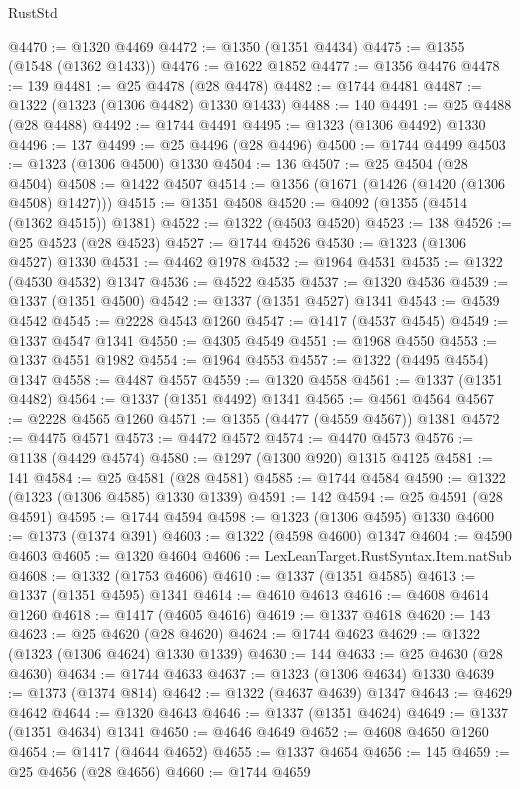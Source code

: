 \begin{lexlean}{RustStd}
\begin{coremodule}
@4470 := @1320 @4469
@4472 := @1350 (@1351 @4434)
@4475 := @1355 (@1548 (@1362 @1433))
@4476 := @1622 @1852
@4477 := @1356 @4476
@4478 := 139
@4481 := @25 @4478 (@28 @4478)
@4482 := @1744 @4481
@4487 := @1322 (@1323 (@1306 @4482) @1330 @1433)
@4488 := 140
@4491 := @25 @4488 (@28 @4488)
@4492 := @1744 @4491
@4495 := @1323 (@1306 @4492) @1330
@4496 := 137
@4499 := @25 @4496 (@28 @4496)
@4500 := @1744 @4499
@4503 := @1323 (@1306 @4500) @1330
@4504 := 136
@4507 := @25 @4504 (@28 @4504)
@4508 := @1422 @4507
@4514 := @1356 (@1671 (@1426 (@1420 (@1306 @4508) @1427)))
@4515 := @1351 @4508
@4520 := @4092 (@1355 (@4514 (@1362 @4515)) @1381)
@4522 := @1322 (@4503 @4520)
@4523 := 138
@4526 := @25 @4523 (@28 @4523)
@4527 := @1744 @4526
@4530 := @1323 (@1306 @4527) @1330
@4531 := @4462 @1978
@4532 := @1964 @4531
@4535 := @1322 (@4530 @4532) @1347
@4536 := @4522 @4535
@4537 := @1320 @4536
@4539 := @1337 (@1351 @4500)
@4542 := @1337 (@1351 @4527) @1341
@4543 := @4539 @4542
@4545 := @2228 @4543 @1260
@4547 := @1417 (@4537 @4545)
@4549 := @1337 @4547 @1341
@4550 := @4305 @4549
@4551 := @1968 @4550
@4553 := @1337 @4551 @1982
@4554 := @1964 @4553
@4557 := @1322 (@4495 @4554) @1347
@4558 := @4487 @4557
@4559 := @1320 @4558
@4561 := @1337 (@1351 @4482)
@4564 := @1337 (@1351 @4492) @1341
@4565 := @4561 @4564
@4567 := @2228 @4565 @1260
@4571 := @1355 (@4477 (@4559 @4567)) @1381
@4572 := @4475 @4571
@4573 := @4472 @4572
@4574 := @4470 @4573
@4576 := @1138 (@4429 @4574)
@4580 := @1297 (@1300 @920) @1315 @4125
@4581 := 141
@4584 := @25 @4581 (@28 @4581)
@4585 := @1744 @4584
@4590 := @1322 (@1323 (@1306 @4585) @1330 @1339)
@4591 := 142
@4594 := @25 @4591 (@28 @4591)
@4595 := @1744 @4594
@4598 := @1323 (@1306 @4595) @1330
@4600 := @1373 (@1374 @391)
@4603 := @1322 (@4598 @4600) @1347
@4604 := @4590 @4603
@4605 := @1320 @4604
@4606 := LexLeanTarget.RustSyntax.Item.natSub
@4608 := @1332 (@1753 @4606)
@4610 := @1337 (@1351 @4585)
@4613 := @1337 (@1351 @4595) @1341
@4614 := @4610 @4613
@4616 := @4608 @4614 @1260
@4618 := @1417 (@4605 @4616)
@4619 := @1337 @4618
@4620 := 143
@4623 := @25 @4620 (@28 @4620)
@4624 := @1744 @4623
@4629 := @1322 (@1323 (@1306 @4624) @1330 @1339)
@4630 := 144
@4633 := @25 @4630 (@28 @4630)
@4634 := @1744 @4633
@4637 := @1323 (@1306 @4634) @1330
@4639 := @1373 (@1374 @814)
@4642 := @1322 (@4637 @4639) @1347
@4643 := @4629 @4642
@4644 := @1320 @4643
@4646 := @1337 (@1351 @4624)
@4649 := @1337 (@1351 @4634) @1341
@4650 := @4646 @4649
@4652 := @4608 @4650 @1260
@4654 := @1417 (@4644 @4652)
@4655 := @1337 @4654
@4656 := 145
@4659 := @25 @4656 (@28 @4656)
@4660 := @1744 @4659

\end{coremodule}
\end{lexlean}
